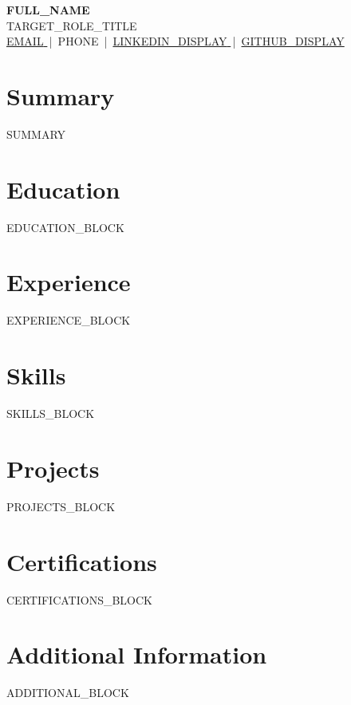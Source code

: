 \documentclass[a4paper,10pt]{article}
\begin{document}
\begin{center}
  {\LARGE\textbf{ {{FULL_NAME}} }}\\[3pt]
  {\normalsize {{TARGET_ROLE_TITLE}} }\\[4pt]
  {\small
    \href{mailto:{{EMAIL}}}{ {{EMAIL}} } \,|\, {{PHONE}} \,|\,
    \href{ {{LINKEDIN_URL}} }{ {{LINKEDIN_DISPLAY}} } \,|\,
    \href{ {{GITHUB_URL}} }{ {{GITHUB_DISPLAY}} }
  }
\end{center}

\section*{Summary}
{{SUMMARY}}

\section*{Education}
{{EDUCATION_BLOCK}}

\section*{Experience}
{{EXPERIENCE_BLOCK}}

\section*{Skills}
{{SKILLS_BLOCK}}

\section*{Projects}
{{PROJECTS_BLOCK}}

\section*{Certifications}
{{CERTIFICATIONS_BLOCK}}

\section*{Additional Information}
{{ADDITIONAL_BLOCK}}
\end{document}
